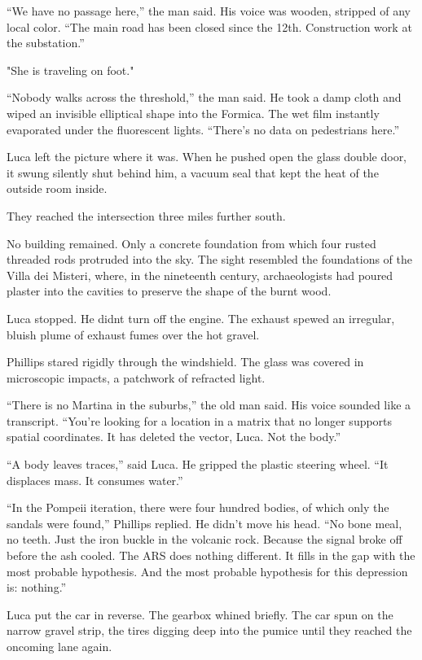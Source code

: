 \documentclass[
  ngerman,
]{article}
\begin{document}
``We have no passage here,'' the man said. His voice was wooden,
stripped of any local color. ``The main road has been closed since the
12th. Construction work at the substation.''

"She is traveling on foot."

``Nobody walks across the threshold,'' the man said. He took a damp
cloth and wiped an invisible elliptical shape into the Formica. The wet
film instantly evaporated under the fluorescent lights. ``There's no
data on pedestrians here.''

Luca left the picture where it was. When he pushed open the glass double
door, it swung silently shut behind him, a vacuum seal that kept the
heat of the outside room inside.

They reached the intersection three miles further south.

No building remained. Only a concrete foundation from which four rusted
threaded rods protruded into the sky. The sight resembled the
foundations of the Villa dei Misteri, where, in the nineteenth century,
archaeologists had poured plaster into the cavities to preserve the
shape of the burnt wood.

Luca stopped. He didn\textquotesingle t turn off the engine. The exhaust
spewed an irregular, bluish plume of exhaust fumes over the hot gravel.

Phillips stared rigidly through the windshield. The glass was covered in
microscopic impacts, a patchwork of refracted light.

``There is no Martina in the suburbs,'' the old man said. His voice
sounded like a transcript. ``You're looking for a location in a matrix
that no longer supports spatial coordinates. It has deleted the vector,
Luca. Not the body.''

``A body leaves traces,'' said Luca. He gripped the plastic steering
wheel. ``It displaces mass. It consumes water.''

``In the Pompeii iteration, there were four hundred bodies, of which
only the sandals were found,'' Phillips replied. He didn't move his
head. ``No bone meal, no teeth. Just the iron buckle in the volcanic
rock. Because the signal broke off before the ash cooled. The ARS does
nothing different. It fills in the gap with the most probable
hypothesis. And the most probable hypothesis for this depression is:
nothing.''

Luca put the car in reverse. The gearbox whined briefly. The car spun on
the narrow gravel strip, the tires digging deep into the pumice until
they reached the oncoming lane again.
\end{document}
